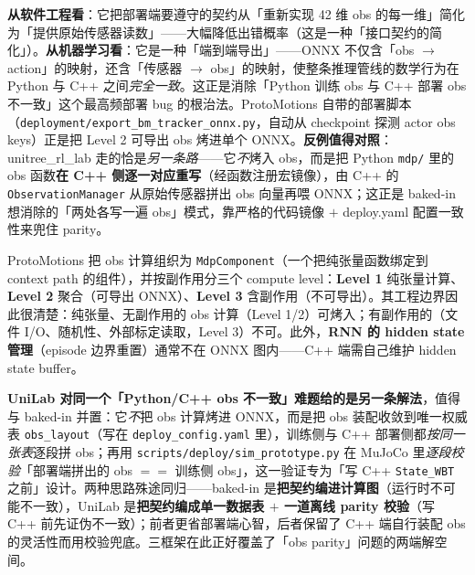 \begin{insight}\label{ins:rlmc-s2r-baked}
\textbf{从软件工程看}：它把部署端要遵守的契约从「重新实现 42 维 obs 的每一维」简化为「提供原始传感器读数」——大幅降低出错概率（这是一种「接口契约的简化」）。\textbf{从机器学习看}：它是一种「端到端导出」——ONNX 不仅含「obs $\to$ action」的映射，还含「传感器 $\to$ obs」的映射，使整条推理管线的数学行为在 Python 与 C++ 之间\emph{完全一致}。这正是消除「Python 训练 obs 与 C++ 部署 obs 不一致」这个最高频部署 bug 的根治法。ProtoMotions 自带的部署脚本（\texttt{deployment/export\_bm\_tracker\_onnx.py}，自动从 checkpoint 探测 actor obs keys）正是把 Level 2 可导出 obs 烤进单个 ONNX。\textbf{反例值得对照}：unitree\_rl\_lab 走的恰是\emph{另一条路}——它\emph{不}烤入 obs，而是把 Python \verb|mdp/| 里的 obs 函数\textbf{在 C++ 侧逐一对应重写}（经函数注册宏镜像），由 C++ 的 \verb|ObservationManager| 从原始传感器拼出 obs 向量再喂 ONNX；这正是 baked-in 想消除的「两处各写一遍 obs」模式，靠严格的代码镜像 $+$ deploy.yaml 配置一致性来兜住 parity。
\end{insight}

ProtoMotions 把 obs 计算组织为 \texttt{MdpComponent}（一个把纯张量函数绑定到 context path 的组件），并按副作用分三个 compute level：\textbf{Level 1} 纯张量计算、\textbf{Level 2} 聚合（可导出 ONNX）、\textbf{Level 3} 含副作用（不可导出）。其工程边界因此很清楚：纯张量、无副作用的 obs 计算（Level 1/2）可烤入；有副作用的（文件 I/O、随机性、外部标定读取，Level 3）不可。此外，\textbf{RNN 的 hidden state 管理}（episode 边界重置）通常不在 ONNX 图内——C++ 端需自己维护 hidden state buffer。

\textbf{UniLab 对同一个「Python/C++ obs 不一致」难题给的是另一条解法}，值得与 baked-in 并置：它\emph{不}把 obs 计算烤进 ONNX，而是把 obs 装配收敛到唯一权威表 \verb|obs_layout|（写在 \verb|deploy_config.yaml| 里），训练侧与 C++ 部署侧都\emph{按同一张表}逐段拼 obs；再用 \texttt{scripts/deploy/sim\_prototype.py} 在 MuJoCo 里\emph{逐段校验}「部署端拼出的 obs $==$ 训练侧 obs」，这一验证专为「写 C++ \verb|State_WBT| 之前」设计。两种思路殊途同归——baked-in 是\textbf{把契约编进计算图}（运行时不可能不一致），UniLab 是\textbf{把契约编成单一数据表 $+$ 一道离线 parity 校验}（写 C++ 前先证伪不一致）；前者更省部署端心智，后者保留了 C++ 端自行装配 obs 的灵活性而用校验兜底。三框架在此正好覆盖了「obs parity」问题的两端解空间。

